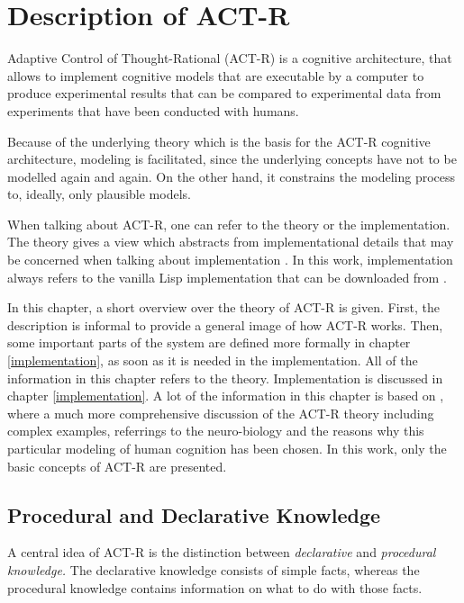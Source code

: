 \chapter{Description of ACT-R}
\label{actr_description}

Adaptive Control of Thought-Rational  (ACT-R) is a cognitive architecture, that allows to implement cognitive models that are executable by a computer to produce experimental results that can be compared to experimental data from experiments that have been conducted with humans.

Because of the underlying theory which is the basis for the ACT-R cognitive architecture, modeling is facilitated, since the underlying concepts have not to be modelled again and again. On the other hand, it constrains the modeling process to, ideally, only plausible models.

When talking about ACT-R, one can refer to the theory or the implementation. The theory gives a view which abstracts from implementational details that may be concerned when talking about implementation . In this work, implementation always refers to the vanilla Lisp implementation that can be downloaded from \cite{actr_homepage}.

In this chapter, a short overview over the theory of ACT-R is given. First, the description is informal to provide a general image of how ACT-R works. Then, some important parts of the system are defined more formally in chapter \ref{implementation}, as soon as it is needed in the implementation. All of the information in this chapter refers to the theory. Implementation is discussed in chapter \ref{implementation}. A lot of the information in this chapter is based on \cite{anderson_how_2007, anderson_integrated_2004, taatgen_modeling_2006}, where a much more comprehensive discussion of the ACT-R theory including complex examples, referrings to the neuro-biology and the reasons why this particular modeling of human cognition has been chosen. In this work, only the basic concepts of ACT-R are presented.

\section{Procedural and Declarative Knowledge}

A central idea of ACT-R is the distinction between \emph{declarative} and \emph{procedural knowledge.} The declarative knowledge consists of simple facts, whereas the procedural knowledge contains information on what to do with those facts.


